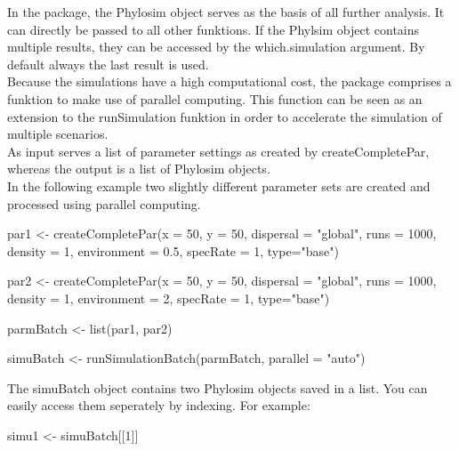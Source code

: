 \documentclass [a4paper]{tufte-book}\usepackage[]{graphicx}\usepackage[]{color}
\begin{document}
In the package, the Phylosim object serves as the basis of all further analysis.
It can directly be passed to all other funktions.
If the Phylsim object contains multiple results, they can be accessed by the which.simulation argument. By default always the last result is used.\\
Because the simulations have a high computational cost, the package comprises a funktion to make use of parallel computing. This function can be seen as an extension to the
runSimulation funktion in order to accelerate the simulation of multiple scenarios.\\
As input serves a list of parameter settings as created by createCompletePar, whereas the output is a list of Phylosim objects.\\
In the following example two slightly different parameter sets are created and processed using parallel computing.

\begin{Schunk}
\begin{Sinput}
par1 <- createCompletePar(x = 50, y = 50, dispersal = "global", runs = 1000, density = 1, environment = 0.5, specRate = 1, type="base")

par2 <- createCompletePar(x = 50, y = 50, dispersal = "global", runs = 1000, density = 1, environment = 2, specRate = 1, type="base")

parmBatch <- list(par1, par2)

simuBatch <- runSimulationBatch(parmBatch, parallel = "auto")
\end{Sinput}
\end{Schunk}

The simuBatch object contains two Phylosim objects saved in a list. You can easily access them seperately by indexing. For example:

\begin{Schunk}
\begin{Sinput}
simu1 <- simuBatch[[1]]
\end{Sinput}
\end{Schunk}
\end{document}

